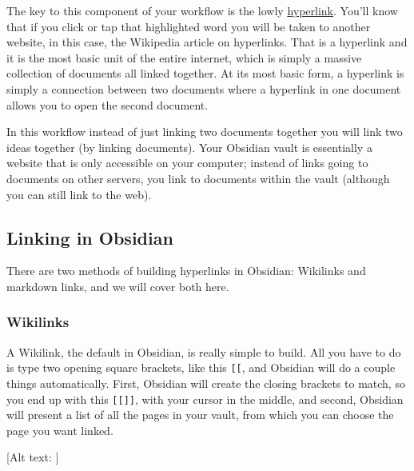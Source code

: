 \documentclass[
  letterpaper,
  DIV=11,
  numbers=noendperiod]{scrreprt}
\begin{document}
The key to this component of your workflow is the lowly
\href{https://en.wikipedia.org/wiki/Hyperlink}{hyperlink}. You'll know
that if you click or tap that highlighted word you will be taken to
another website, in this case, the Wikipedia article on hyperlinks. That
is a hyperlink and it is the most basic unit of the entire internet,
which is simply a massive collection of documents all linked together.
At its most basic form, a hyperlink is simply a connection between two
documents where a hyperlink in one document allows you to open the
second document.

In this workflow instead of just linking two documents together you will
link two ideas together (by linking documents). Your Obsidian vault is
essentially a website that is only accessible on your computer; instead
of links going to documents on other servers, you link to documents
within the vault (although you can still link to the web).

\subsection*{Linking in Obsidian}\label{linking-in-obsidian}

There are two methods of building hyperlinks in Obsidian: Wikilinks and
markdown links, and we will cover both here.

\subsubsection*{Wikilinks}\label{wikilinks}

A Wikilink, the default in Obsidian, is really simple to build. All you
have to do is type two opening square brackets, like this
\texttt{{[}{[}}, and Obsidian will do a couple things automatically.
First, Obsidian will create the closing brackets to match, so you end up
with this \texttt{{[}{[}{]}{]}}, with your cursor in the middle, and
second, Obsidian will present a list of all the pages in your vault,
from which you can choose the page you want linked.

{[}Alt text: {]}
\end{document}
